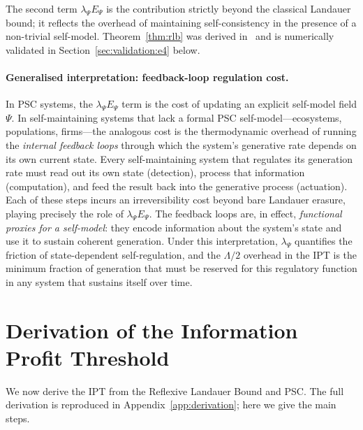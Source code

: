 \documentclass[11pt,twocolumn]{article}
\theoremstyle{remark}
\begin{document}
\noindent The second term $\lambda_\Psi E_\Psi$ is the contribution
strictly beyond the classical Landauer bound; it reflects the overhead
of maintaining self-consistency in the presence of a non-trivial
self-model. Theorem~\ref{thm:rlb} was derived in~\cite{SpivackNEMSMFRRBridge}
and is numerically validated in Section~\ref{sec:validation:e4} below.

\paragraph{Generalised interpretation: feedback-loop regulation cost.}
In PSC systems, the $\lambda_\Psi E_\Psi$ term is the cost of updating an
explicit self-model field $\Psi$. In self-maintaining systems that lack a
formal PSC self-model---ecosystems, populations, firms---the analogous cost
is the thermodynamic overhead of running the \emph{internal feedback loops}
through which the system's generative rate depends on its own current state.
Every self-maintaining system that regulates its generation rate must read
out its own state (detection), process that information (computation), and
feed the result back into the generative process (actuation). Each of these
steps incurs an irreversibility cost beyond bare Landauer erasure, playing
precisely the role of $\lambda_\Psi E_\Psi$. The feedback loops are, in
effect, \emph{functional proxies for a self-model}: they encode information
about the system's state and use it to sustain coherent generation. Under
this interpretation, $\lambda_\Psi$ quantifies the friction of
state-dependent self-regulation, and the $\Lambda/2$ overhead in the IPT
is the minimum fraction of generation that must be reserved for this
regulatory function in any system that sustains itself over time.

\section{Derivation of the Information Profit Threshold}
\label{sec:derivation}

We now derive the IPT from the Reflexive Landauer Bound and PSC. The
full derivation is reproduced in Appendix~\ref{app:derivation}; here we
give the main steps.
\end{document}
